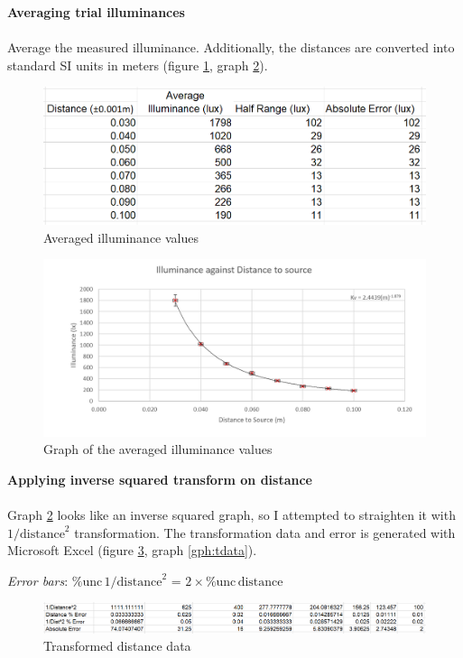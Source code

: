 \documentclass[a4paper,12pt]{article}
\newcommand{\relun}{\% \text{unc}\,}
\newcommand{\paragraphnl}[1]{\textbf{#1}\\\\}
\begin{document}
\paragraphnl{Averaging trial illuminances}
Average the measured illuminance. Additionally, the distances are converted into standard SI units in meters (figure \ref{fig:average}, graph \ref{gph:average}).

\begin{figure}[H]
    \centering
    \includegraphics[scale=0.5]{assets/averagedata.png}
    \caption{Averaged illuminance values}
    \label{fig:average}
\end{figure}

\begin{figure}[H]
    \centering
    \includegraphics[width=\textwidth]{assets/averagegraph.png}
    \caption{Graph of the averaged illuminance values}
    \label{gph:average}
\end{figure}


\paragraphnl{Applying inverse squared transform on distance}
Graph \ref{gph:average} looks like an inverse squared graph, so I attempted to straighten it with $1/{\text{distance}}^2$ transformation. The transformation data and error is generated with Microsoft Excel (figure \ref{fig:tdata}, graph \ref{gph:tdata}).

\textit{Error bars}: $\relun 1/{\text{distance}}^2$ = $2 \times \relun \text{distance}$

\begin{figure}[H]
    \centering
    \includegraphics[width=\textwidth]{assets/transformdata.png}
    \caption{Transformed distance data}
    \label{fig:tdata}
\end{figure}
\end{document}

